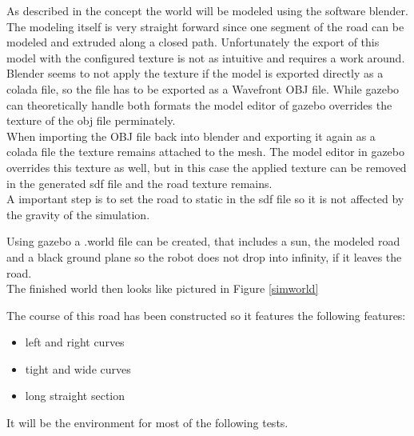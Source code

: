 As described in the concept the world will be modeled using the software blender.\\

The modeling itself is very straight forward since one segment of the road can be modeled and extruded along a closed path. Unfortunately the export of this model with the configured texture is not as intuitive and requires a work around.\\

Blender seems to not apply the texture if the model is exported directly as a colada file, so the file has to be exported as a Wavefront OBJ file. While gazebo can theoretically handle both formats the model editor of gazebo overrides the texture of the obj file perminately.\\

When importing the OBJ file back into blender and exporting it again as a colada file the texture remains attached to the mesh. The model editor in gazebo overrides this texture as well, but in this case the applied texture can be removed in the generated sdf file and the road texture remains.\\

A important step is to set the road to static in the sdf file so it is not affected by the gravity of the simulation.

Using gazebo a .world file can be created, that includes a sun, the modeled road and a black ground plane so the robot does not drop into infinity, if it leaves the road.\\

The finished world then looks like pictured in Figure \ref{simworld}

The course of this road has been constructed so it features the following features:

\begin{itemize}
	\item left and right curves
	\item tight and wide curves
	\item long straight section
\end{itemize}

It will be the environment for most of the following tests.

